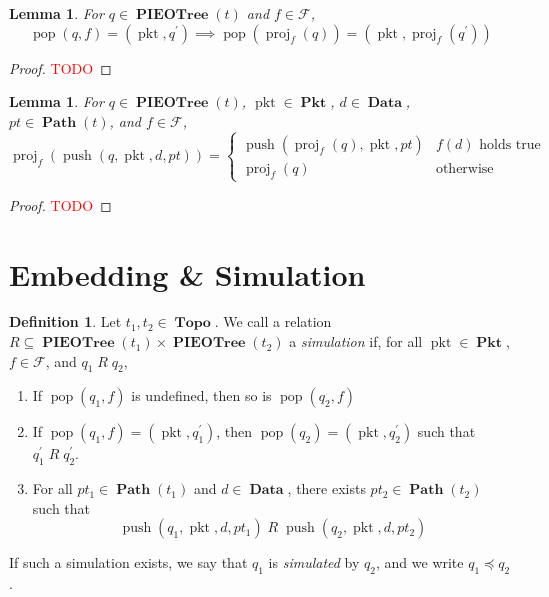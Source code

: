 \documentclass{amsart}
\DeclareMathOperator{\pkt}{\mathrm{pkt}}
\DeclareMathOperator{\push}{\mathrm{push}}
\DeclareMathOperator{\pop}{\mathrm{pop}}
\DeclareMathOperator{\proj}{\mathrm{proj}}
\DeclareMathOperator{\Pkt}{\mathbf{Pkt}}
\DeclareMathOperator{\Data}{\mathbf{Data}}
\DeclareMathOperator{\Topo}{\mathbf{Topo}}
\DeclareMathOperator{\Path}{\mathbf{Path}}
\DeclareMathOperator{\PIEOTree}{\mathbf{PIEOTree}}
\newtheorem{lem}[thm]{Lemma}
\theoremstyle{definition}
\newtheorem{dfn}[thm]{Definition}
\begin{document}
\begin{lem}
    \label{lem:pop}
    For $q \in \PIEOTree(t)$ and $f \in \mathcal F$, 
    $$
        \pop(q, f) = (\pkt, q^\prime) \implies \pop(\proj_f(q)) = (\pkt, \proj_f(q^\prime))
    $$
\end{lem}

\begin{proof}
    \textcolor{red}{TODO}
\end{proof}

\begin{lem}
    \label{lem:push}
    For $q \in \PIEOTree(t)$, $\pkt \in \Pkt$, $d \in \Data$, $pt \in \Path(t)$, and $f \in \mathcal F$,
    $$
        \proj_f(\push(q, \pkt, d, pt)) = 
        \begin{cases}
            \push(\proj_f(q), \pkt, pt) & f(d) \text{ holds true}\\
            \proj_f(q) & \text{otherwise}
        \end{cases}
    $$
\end{lem}

\begin{proof}
    \textcolor{red}{TODO}
\end{proof}


\section{Embedding \& Simulation}

\begin{dfn}
    \label{dfn:sim}
    Let $t_1, t_2 \in \Topo$. 
    We call a relation $R \subseteq \PIEOTree(t_1) \times \PIEOTree(t_2)$ a \emph{simulation} if, 
    for all $\pkt \in \Pkt$, $f \in \mathcal F$, and $q_1 \; R \; q_2$,
    \begin{enumerate}
        \item If $\pop(q_1, f)$ is undefined, then so is $\pop(q_2, f)$
        \item If $\pop(q_1, f) = (\pkt, q_1^\prime)$, then $\pop(q_2) = (\pkt, q_2^\prime)$ such that $q_1^\prime \; R \; q_2^\prime$.
        \item For all $pt_1 \in \Path(t_1)$ and $d \in \Data$, there exists $pt_2 \in \Path(t_2)$ such that
            $$\push(q_1, \pkt, d, pt_1) \; R \; \push(q_2, \pkt, d, pt_2)$$
    \end{enumerate}
    If such a simulation exists, we say that $q_1$ is \emph{simulated} by $q_2$, and we write $q_1 \preccurlyeq q_2$.
\end{dfn}
\end{document}
